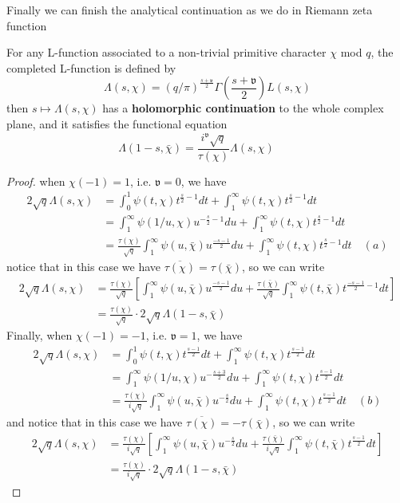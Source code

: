Finally we can finish the analytical continuation as we do in Riemann zeta function

\begin{colortheorem}
    For any L-function associated to a non-trivial primitive character \(\chi\) mod \(q\), the completed L-function is defined by
    \[\Lambda(s,\chi) = (q/\pi)^{\frac{s+\mathfrak{v}}{2}}\Gamma(\frac{s+\mathfrak{v}}{2})L(s,\chi)\]
    then \(s \mapsto \Lambda(s,\chi)\) has a \textbf{holomorphic continuation} to the whole complex plane, and it satisfies the functional equation
        \[\Lambda(1-s,\bar{\chi}) = \frac{i^{\mathfrak{v}}\sqrt{q}}{\tau(\chi)} \Lambda(s,\chi) \qquad \] 
\end{colortheorem}

\begin{proof}
    when \(\chi(-1)=1\), i.e. \(\mathfrak{v} = 0\), we have
    \begin{align*}
        2\sqrt{q}\Lambda(s,\chi) &= \int_0^{1} \psi(t,\chi) t^{\frac{s}{2}-1} dt + \int_1^{\infty} \psi(t,\chi) t^{\frac{s}{2}-1} dt \\
        &= \int_{1}^{\infty} \psi(1/u,\chi) u^{-\frac{s}{2}-1} du + \int_1^{\infty} \psi(t,\chi) t^{\frac{s}{2}-1} dt \\
        &= \frac{\tau(\chi)}{\sqrt{q}}\int_{1}^{\infty} \psi(u,\bar{\chi}) u^{\frac{-s-1}{2}} du + \int_1^{\infty} \psi(t,\chi) t^{\frac{s}{2}-1} dt \quad (a)
    \end{align*}
    notice that in this case we have \(\overline{\tau(\chi)} = \tau(\bar{\chi})\), so we can write
    \begin{align*}
        2\sqrt{q}\Lambda(s,\chi) &= \frac{\tau(\chi)}{\sqrt{q}}[\int_{1}^{\infty} \psi(u,\bar{\chi}) u^{\frac{-s-1}{2}} du + \frac{\tau(\bar{\chi})}{\sqrt{q}}\int_1^{\infty} \psi(t,\bar{\chi}) t^{\frac{-s-1}{2}-1} dt] \\
        &= \frac{\tau(\chi)}{\sqrt{q}}\cdot 2\sqrt{q}\Lambda(1-s,\bar{\chi})
    \end{align*}
    Finally, when \(\chi(-1)=-1\), i.e. \(\mathfrak{v} = 1\), we have
    \begin{align*}
        2\sqrt{q}\Lambda(s,\chi) &= \int_0^{1} \psi(t,\chi) t^{\frac{s-1}{2}} dt + \int_1^{\infty} \psi(t,\chi) t^{\frac{s-1}{2}} dt \\
        &= \int_{1}^{\infty} \psi(1/u,\chi) u^{-\frac{s+3}{2}} du + \int_1^{\infty} \psi(t,\chi) t^{\frac{s-1}{2}} dt \\
        &= \frac{\tau(\chi)}{i\sqrt{q}}\int_{1}^{\infty} \psi(u,\bar{\chi}) u^{-\frac{s}{2}} du + \int_1^{\infty} \psi(t,\chi) t^{\frac{s-1}{2}} dt \quad (b)
    \end{align*}
    and notice that in this case we have \(\overline{\tau(\chi)} = -\tau(\bar{\chi})\), so we can write
    \begin{align*}
        2\sqrt{q}\Lambda(s,\chi) &= \frac{\tau(\chi)}{i\sqrt{q}}[\int_{1}^{\infty} \psi(u,\bar{\chi}) u^{-\frac{s}{2}} du + \frac{\tau(\bar{\chi})}{i\sqrt{q}}\int_1^{\infty} \psi(t,\bar{\chi}) t^{\frac{s-1}{2}} dt] \\
        &= \frac{\tau(\chi)}{i\sqrt{q}}\cdot 2\sqrt{q}\Lambda(1-s,\bar{\chi})
    \end{align*}
\end{proof}

